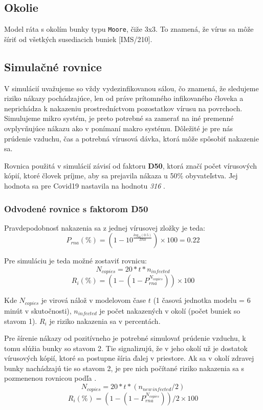 \documentclass[a4paper, 11pt]{article}
\begin{document}
        \subsection{Okolie}
        Model ráta s okolím bunky typu \texttt{Moore}, čiže 3x3. To znamená, že vírus sa môže šíriť od všetkých susediacich buniek [IMS/210].
    
        \subsection{Simulačné rovnice}
        V simulácií uvažujeme so vždy vydezinfikovanou sálou, čo znamená, že sledujeme riziko nákazy pochádzajúce, len od práve prítomného infikovaného človeka a neprichádza k nakazeniu prostredníctvom pozostatkov vírusu na povrchoch. Simulujeme mikro systém, je preto potrebné sa zamerať na iné premenné ovplyvňujúce nákazu ako v ponímaní makro systému. Dôležité je pre nás prúdenie vzduchu, čas a potrebná vírusová dávka, ktorá môže spôsobiť nakazenie sa.   
        \par Rovnica použitá v simulácií závisí od faktoru \textbf{D50}, ktorá značí počet vírusových kópií, ktoré človek príjme, aby sa prejavila nákaza u 50\% obyvateľstva. Jej hodnota sa pre Covid19 nastavila na hodnotu \textit{316} \cite{joslelieveldfrankhelleiset.al.2020}.
        
        \subsubsection{Odvodené rovnice s faktorom D50}
        Pravdepodobnosť nakazenia sa z jednej vírusovej zložky je teda:
        $$
            P_{rna} (\%) = (1 - 10^{\frac{log_{10}(0.5)}{D50}}) \times 100 = 0.22%
        $$
        
        Pre simuláciu je teda možné zostaviť rovnicu:
        $$
            N_{copies} =  20 * t * n_{infected} 
        $$
        $$
            R_{i} (\%) = (1 - (1 - P_{rna}^{N_{copies}})) \times 100
        $$
        
        Kde $N_{copies}$ je virová nálož v modelovom čase $t$ (1 časová jednotka modelu = 6 minút v skutočnosti), $n_{infected}$ je počet nakazených v okolí (počet buniek so stavom 1). $R_{i}$ je riziko nakazenia sa v percentách.
        
        Pre šírenie nákazy od pozitívneho je potrebné simulovať prúdenie vzduchu, k tomu slúžia bunky so stavom 2. Tie signalizujú, že v jeho okolí už je dostatok vírusových kópií, ktoré sa postupne šíria ďalej v priestore. Ak sa v okolí zdravej bunky nachádzajú tie so stavom 2, je pre nich počítané riziko nakazenia sa s pozmenenou rovnicou podľa  \cite{3feetrule}.
        $$
            N_{copies} =  20 * t * (n_{new\,infected} / 2) 
        $$
        $$
            R_{i} (\%) = (1 - (1 - P_{rna}^{N_{copies}})) / 2 \times 100
        $$
        
\end{document}
